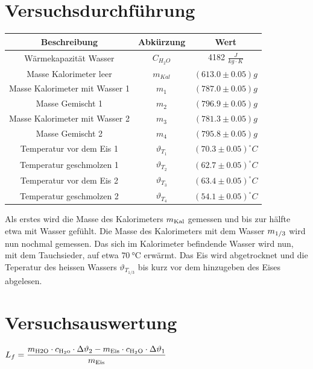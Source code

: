 \documentclass[a4paper,12pt]{article}
\begin{document}
\section{Versuchsdurchführung}
\begin{table}[H]
    \centering
    \begin{tabular}{|c|c|c|}
        \hline
        \textbf{Beschreibung} & \textbf{Abkürzung} & \textbf{Wert} \\
        \hline
        Wärmekapazität Wasser & $C_{H_{2}O}$ & 4182 $\frac{J}{kg\cdot{}K}$\\
        \hline
        Masse Kalorimeter leer & $m_{Kal}$ & $(613.0\pm 0.05)g$\\
        Masse Kalorimeter mit Wasser 1 & $m_{1}$ & $(787.0\pm 0.05)g$\\
        \hline
        Masse Gemischt 1 & $m_{2}$ & $(796.9\pm 0.05)g$\\
        Masse Kalorimeter mit Wasser 2 & $m_{3}$ & $(781.3\pm 0.05)g$\\
    Masse Gemischt 2 & $m_{4}$ & $(795.8\pm 0.05)g$\\
        \hline
        Temperatur vor dem Eis 1 & $\vartheta_{T_{1}}$ & $(70.3\pm 0.05)^{\circ}C$\\
        Temperatur geschmolzen 1 & $\vartheta_{T_{2}}$ & $(62.7\pm 0.05) ^{\circ}C$\\
        \hline
        Temperatur vor dem Eis 2 & $\vartheta_{T_{3}}$ & $(63.4\pm 0.05)^{\circ}C$\\
        Temperatur geschmolzen 2 & $\vartheta_{T_{4}}$ & $(54.1\pm 0.05) ^{\circ}C$\\
        \hline
    \end{tabular}
\end{table}
Als erstes wird die Masse des Kalorimeters $m_{\rm{Kal}} $ gemessen  und bis zur hälfte etwa mit Wasser gefühlt. Die Masse des Kalorimeters mit dem Wasser $m_{\rm{1/3}} $ wird nun nochmal gemessen. Das sich im Kalorimeter befindende Wasser wird nun, mit dem Tauchsieder, auf etwa   $\SI{70}{\celsius} $ erwärmt. Das Eis wird abgetrocknet und die Teperatur des heissen Wassers $\vartheta_{T_{1/3}} $ bis kurz vor dem hinzugeben des Eises abgelesen. 
\section{Versuchsauswertung}

$L_{f}= \displaystyle{\frac{m_{\rm{H2O}} \cdot c_{\rm{H_2o}} \cdot \Delta\vartheta_2 - m_{\rm{Eis}} \cdot c_{\rm{H_2O}} \cdot \Delta\vartheta_1}{m_{\rm{Eis}}}}$
\end{document}
